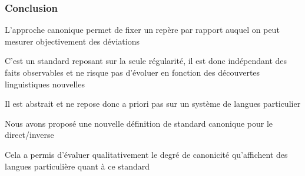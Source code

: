 
\begin{frame}
\frametitle{Conclusion}
\footnotesize
\begin{wideitemize}%
\item[\highlightii{\lefthand}]  L'approche canonique permet de fixer
  un repère par rapport auquel on peut mesurer objectivement des déviations
\item C'est un standard reposant sur la seule régularité, il est donc
  indépendant des faits observables et ne risque pas d'évoluer en
  fonction des découvertes linguistiques nouvelles
\item Il est abstrait et ne repose donc a priori pas sur un système de
  langues particulier
\item[\highlightiv{\lefthand}] Nous avons proposé une nouvelle
  définition de standard canonique pour le direct/inverse
\item Cela a permis d'évaluer qualitativement le degré de canonicité
  qu'affichent des langues particulière quant à ce standard
\end{wideitemize}
\end{frame}

